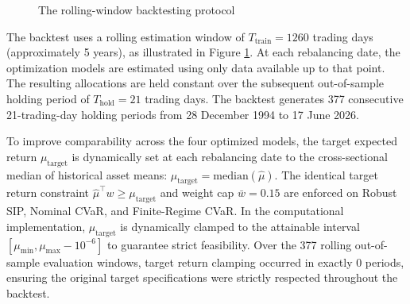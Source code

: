 \documentclass[smallcondensed]{svjour3}
\begin{document}
\begin{figure}[!htbp]
\centering
{}
\caption{The rolling-window backtesting protocol}
\label{fig:schema3}
\end{figure}

The backtest uses a rolling estimation window of $T_{\text{train}} = 1260$ trading days (approximately 5 years), as illustrated in Figure \ref{fig:schema3}. At each rebalancing date, the optimization models are estimated using only data available up to that point. The resulting allocations are held constant over the subsequent out-of-sample holding period of $T_{\text{hold}} = 21$ trading days. The backtest generates 377 consecutive 21-trading-day holding periods from 28 December 1994 to 17 June 2026.

To improve comparability across the four optimized models, the target expected return $\mu_{\text{target}}$ is dynamically set at each rebalancing date to the cross-sectional median of historical asset means: $\mu_{\text{target}} = \text{median}(\hat{\mu})$. The identical target return constraint $\hat{\mu}^\top w \ge \mu_{\text{target}}$ and weight cap $\bar{w} = 0.15$ are enforced on Robust SIP, Nominal CVaR, and Finite-Regime CVaR. In the computational implementation, $\mu_{\text{target}}$ is dynamically clamped to the attainable interval $[\mu_{\min}, \mu_{\max} - 10^{-6}]$ to guarantee strict feasibility. Over the 377 rolling out-of-sample evaluation windows, target return clamping occurred in exactly 0 periods, ensuring the original target specifications were strictly respected throughout the backtest.
\end{document}
